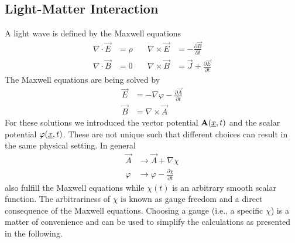 \subsection{Light-Matter Interaction}
A light wave is defined by the Maxwell equations
\begin{equation*}
    \begin{aligned}
        \nabla \cdot \vec{E} &= \rho \quad & \nabla \times \vec{E} &= -\frac{\partial \vec{B}}{\partial t} \\
        \nabla \cdot \vec{B} &= 0 \quad & \nabla \times \vec{B} &= \vec{J} + \frac{\partial \vec{E}}{\partial t}
    \end{aligned}
\end{equation*}
The Maxwell equations are being solved by
\begin{equation}
    \begin{aligned}
        \vec{E} &= -\nabla \varphi - \frac{\partial \vec{A}}{\partial t}\\ \label{eq:potentials}
        \vec{B} &= \nabla \times \vec{A}
    \end{aligned}
\end{equation}
For these solutions we introduced the vector potential $\mathbf{A}(\underline{x}, t)$ and the scalar potential $\varphi(\underline{x}, t)$. 
These are not unique such that different choices can result in the same physical setting. In general
\begin{equation*}
    \begin{aligned}
        \vec{A} &\to \vec{A} + \nabla \chi \\
        \varphi &\to \varphi - \frac{\partial \chi }{\partial t}   
    \end{aligned}
\end{equation*}
also fulfill the Maxwell equations while $\chi(t)$ is an arbitrary smooth scalar function. The arbitrariness of $\chi$ is known as gauge freedom and a direct consequence of the Maxwell equations.
Choosing a gauge (i.e., a specific $\chi$) is a matter of convenience and can be used to simplify the calculations as presented in the following.








